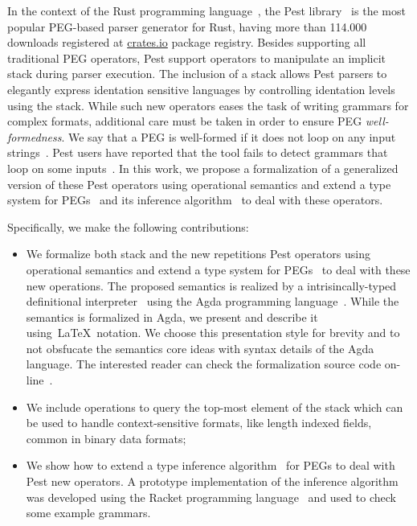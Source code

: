 \documentclass[sigplan,screen]{acmart}
\theoremstyle{definition}
\begin{document}
In the context of the Rust programming language~\cite{RustBook}, the
Pest library~\cite{PEST} is the most popular PEG-based parser
generator for Rust, having more than 114.000 downloads registered at
\href{http://crates.io}{crates.io} package registry. Besides supporting
all traditional PEG operators, Pest support operators to manipulate an
implicit stack during parser execution. The inclusion of a stack allows
Pest parsers to elegantly express identation sensitive languages by
controlling identation levels using the stack. While such new operators
eases the task of writing grammars for complex formats, additional care
must be taken in order to ensure PEG \emph{well-formedness}. We
say that a PEG is well-formed if it does not loop on any input
strings~\cite{Ford2004}. Pest users have reported that the tool
fails to detect grammars that loop on some inputs~\cite{PESTBUG}.
In this work, we propose a formalization of a generalized version
of these Pest operators using operational semantics and
extend a type system for PEGs~\cite{Ribeiro19} and its
inference algorithm~\cite{Cardoso23} to deal with these operators.

Specifically, we make the following contributions:

\begin{itemize}
  \item We formalize both stack and the new repetitions Pest operators using
    operational semantics and extend a type system for PEGs~\cite{Ribeiro19}
    to deal with these new operations. The proposed semantics is realized by a
    intrisincally-typed definitional interpreter~\cite{Poulsen17} using the
    Agda programming language~\cite{Norell08}. While the semantics is formalized
    in Agda, we present and describe it using~\LaTeX~notation. We choose this
    presentation style for brevity and to not obsfucate the semantics core ideas
    with syntax details of the Agda language. The interested reader can check
    the formalization source code on-line~\cite{pegrepository}.
  \item We include operations to query the top-most element of the stack
    which can be used to handle context-sensitive formats, like length
    indexed fields, common in binary data formats;
  \item We show how to extend a type inference algorithm~\cite{Cardoso23} for PEGs
    to deal with Pest new operators. A prototype implementation of the inference
    algorithm was developed using the Racket programming language~\cite{Culpepper19}
    and used to check some example grammars.
\end{itemize}
\end{document}
